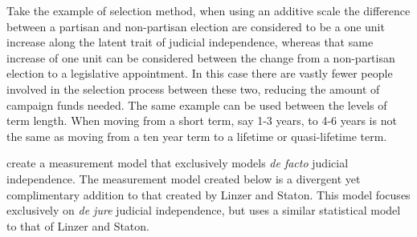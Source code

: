 \documentclass[JohnsonMADraft2.tex]{subfiles}
\begin{document}
Take the example of selection method, when using an additive scale the difference between a partisan and non-partisan election are considered to be a one unit increase along the latent trait of judicial independence, whereas that same increase of one unit can be considered between the change from a non-partisan election to a legislative appointment.  In this case there are vastly fewer people involved in the selection process between these two, reducing the amount of campaign funds needed.  The same example can be used between the levels of term length.  When moving from a short term, say 1-3 years, to 4-6 years is not the same as moving from a ten year term to a lifetime or quasi-lifetime term.

\citet*{Linzer2014} create a measurement model that exclusively models \textit{de facto} judicial independence.  The measurement model created below is a divergent yet complimentary addition to that created by Linzer and Staton.  This model focuses exclusively on \textit{de jure} judicial independence, but uses a similar statistical model to that of Linzer and Staton.  
\end{document}
